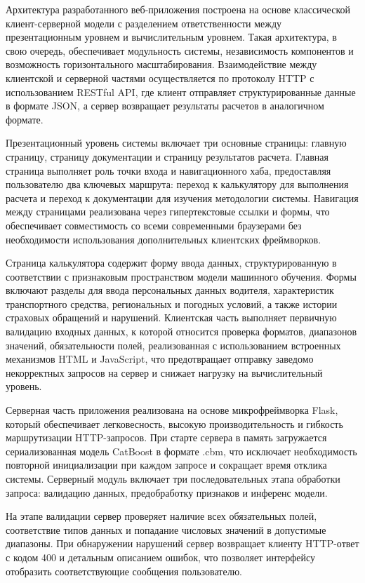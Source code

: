 Архитектура разработанного веб-приложения построена на основе классической клиент-серверной модели с разделением ответственности между презентационным уровнем и вычислительным уровнем. Такая архитектура, в свою очередь, обеспечивает модульность системы, независимость компонентов и возможность горизонтального масштабирования. Взаимодействие между клиентской и серверной частями осуществляется по протоколу HTTP с использованием RESTful API, где клиент отправляет структурированные данные в формате JSON, а сервер возвращает результаты расчетов в аналогичном формате.

Презентационный уровень системы включает три основные страницы: главную страницу, страницу документации и страницу результатов расчета. Главная страница выполняет роль точки входа и навигационного хаба, предоставляя пользователю два ключевых маршрута: переход к калькулятору для выполнения расчета и переход к документации для изучения методологии системы. Навигация между страницами реализована через гипертекстовые ссылки и формы, что обеспечивает совместимость со всеми современными браузерами без необходимости использования дополнительных клиентских фреймворков.

Страница калькулятора содержит форму ввода данных, структурированную в соответствии с признаковым пространством модели машинного обучения. Формы включают разделы для ввода персональных данных водителя, характеристик транспортного средства, региональных и погодных условий, а также истории страховых обращений и нарушений. Клиентская часть выполняет первичную валидацию входных данных, к которой относится проверка форматов, диапазонов значений, обязательности полей, реализованная с использованием встроенных механизмов HTML и JavaScript, что предотвращает отправку заведомо некорректных запросов на сервер и снижает нагрузку на вычислительный уровень.

Серверная часть приложения реализована на основе микрофреймворка Flask, который обеспечивает легковесность, высокую производительность и гибкость маршрутизации HTTP-запросов. При старте сервера в память загружается сериализованная модель CatBoost в формате .cbm, что исключает необходимость повторной инициализации при каждом запросе и сокращает время отклика системы. Серверный модуль включает три последовательных этапа обработки запроса: валидацию данных, предобработку признаков и инференс модели.

На этапе валидации сервер проверяет наличие всех обязательных полей, соответствие типов данных и попадание числовых значений в допустимые диапазоны. При обнаружении нарушений сервер возвращает клиенту HTTP-ответ с кодом 400 и детальным описанием ошибок, что позволяет интерфейсу отобразить соответствующие сообщения пользователю.

